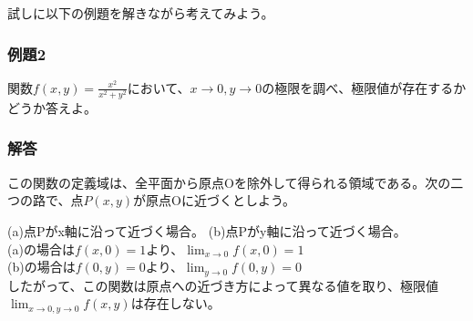 \documentclass[a4j,dvipdfmx]{jsarticle}
\begin{document}
試しに以下の例題を解きながら考えてみよう。
\subsubsection*{例題2}
関数$\displaystyle f(x,y)=\frac{x^2}{x^2+y^2}$において、$x\to 0,y\to 0$の極限を調べ、極限値が存在するかどうか答えよ。


\subsubsection*{解答}
この関数の定義域は、全平面から原点Oを除外して得られる領域である。次の二つの路で、点$P(x,y)$が原点Oに近づくとしよう。

(a)点Pがx軸に沿って近づく場合。
(b)点Pがy軸に沿って近づく場合。\\
(a)の場合は$f(x,0)=1$より、$\displaystyle \lim_{x\to 0}f(x,0)=1$\\
(b)の場合は$f(0,y)=0$より、$\displaystyle \lim_{y\to 0}f(0,y)=0$\\
したがって、この関数は原点への近づき方によって異なる値を取り、極限値$\displaystyle\lim_{x\to 0,y\to 0}f(x,y)$は存在しない。
\end{document}
